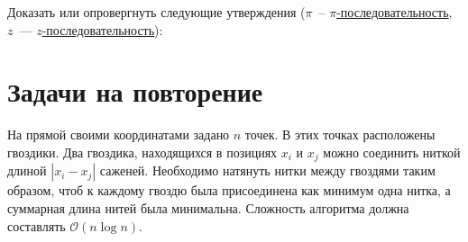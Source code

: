 \documentclass[addpoints]{exam}
\begin{document}
\begin{questions}
\question[1] Доказать или опровергнуть следующие утверждения ($\pi$~-- \hyperref[piseq]{$\pi$-последовательность}, $z$~--- \hyperref[zseq]{$z$-последовательность}):

\section{Задачи на повторение}

\question[\half] На прямой своими координатами задано $n$ точек. В этих точках расположены гвоздики. Два гвоздика, находящихся в позициях $x_i$ и $x_j$ можно соединить ниткой длиной $|x_i - x_j|$ саженей. Необходимо натянуть нитки между гвоздями таким образом, чтоб к каждому гвоздю была присоединена как минимум одна нитка, а суммарная длина нитей была минимальна. Сложность алгоритма должна составлять $\mathcal{O}( n \log n)$.

\begin{solution}


\end{solution}
\end{questions}
\end{document}
